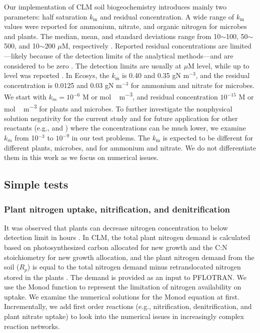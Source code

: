 \documentclass[gmd, manuscript]{copernicus}
\begin{document}
Our implementation of CLM soil biogeochemistry introduces mainly two parameters:
half saturation $k_\text{m}$ and residual concentration. A wide range of
$k_\text{m}$ values were reported for ammonium, nitrate, and organic nitrogen
for microbes and plants. The median, mean, and standard deviations range from
10$\sim$100, 50$\sim$500, and 10$\sim$200 $\mu$M, respectively
\citep{Kuzyakov2013}. Reported residual concentrations are limited---likely because of the detection
limits of the analytical methods---and are
considered to be zero \cite[e.g.,][]{Hogh1997}. The detection limits are usually at $\mu$M
level, while up to  level was reported \citep{Nollet2013}. In Ecosys,
the $k_\text{m}$ is 0.40 and 0.35 gN m$^{-3}$, and the residual concentration
is 0.0125 and 0.03 gN m$^{-3}$ \citep{Grant2013} for ammonium and nitrate for
microbes. We start with $k_m=10^{-6}$ \unit{M} or \unit{mol\,m^{-3}}, and
residual concentration $10^{-15}$ \unit{M} or \unit{mol\, m^{-3}} for plants
and microbes. To further investigate the nonphysical solution negativity for
the current study and for future application for other reactants (e.g.,
 and ) where the concentrations can be much lower, we
examine $k_m$ from 10$^{-3}$ to $10^{-9}$ in our test problems. The
$k_\text{m}$ is expected to be different for different plants, microbes, and
for ammonium and nitrate. We do not differentiate them in this work as we focus
on numerical issues. 
\subsection{Simple tests}
\subsubsection{Plant nitrogen uptake, nitrification, and denitrification}
\label{sec:test1}
It was observed that plants can decrease nitrogen concentration to below
detection limit in hours \citep{Kamer2001}. 
In CLM, the total plant nitrogen demand is
calculated based on photosynthesized carbon allocated for new growth and the
C:N stoichiometry for new growth allocation, and the plant nitrogen demand from
the soil ($R_p$) is equal to the total nitrogen demand minus retranslocated nitrogen
stored in the plants  \citep{Oleson2013}. The demand is provided
as an input to PFLOTRAN. We use the
Monod function to represent the limitation of nitrogen availability on uptake.
We examine the numerical solutions for the Monod equation at first. Incrementally, we
add first order reactions (e.g., nitrification, denitrification, and plant
nitrate uptake) to look into the numerical issues in increasingly complex reaction networks. 
\end{document}
